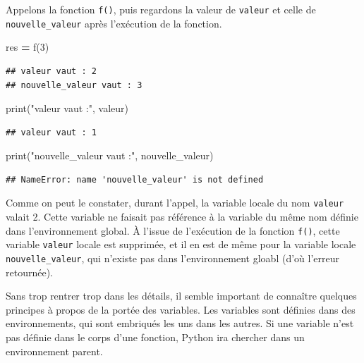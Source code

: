 \documentclass[
  12pt,
]{book}
\newenvironment{Shaded}{\begin{snugshade}}{\end{snugshade}}
\newcommand{\BuiltInTok}[1]{#1}
\newcommand{\DecValTok}[1]{\textcolor[rgb]{0.00,0.00,0.81}{#1}}
\newcommand{\NormalTok}[1]{#1}
\newcommand{\OperatorTok}[1]{\textcolor[rgb]{0.81,0.36,0.00}{\textbf{#1}}}
\newcommand{\StringTok}[1]{\textcolor[rgb]{0.31,0.60,0.02}{#1}}
\numberwithin{equation}{section}
\numberwithin{countremarque}{section}
\begin{document}
Appelons la fonction \texttt{f()}, puis regardons la valeur de \texttt{valeur} et celle de \texttt{nouvelle\_valeur} après l'exécution de la fonction.

\begin{Shaded}
\begin{Highlighting}[]
\NormalTok{res }\OperatorTok{=}\NormalTok{ f(}\DecValTok{3}\NormalTok{)}
\end{Highlighting}
\end{Shaded}

\begin{lstlisting}
## valeur vaut : 2
## nouvelle_valeur vaut : 3
\end{lstlisting}

\begin{Shaded}
\begin{Highlighting}[]
\BuiltInTok{print}\NormalTok{(}\StringTok{"valeur vaut :"}\NormalTok{, valeur)}
\end{Highlighting}
\end{Shaded}

\begin{lstlisting}
## valeur vaut : 1
\end{lstlisting}

\begin{Shaded}
\begin{Highlighting}[]
\BuiltInTok{print}\NormalTok{(}\StringTok{"nouvelle\_valeur vaut :"}\NormalTok{, nouvelle\_valeur)}
\end{Highlighting}
\end{Shaded}

\begin{lstlisting}
## NameError: name 'nouvelle_valeur' is not defined
\end{lstlisting}

Comme on peut le constater, durant l'appel, la variable locale du nom \texttt{valeur} valait 2. Cette variable ne faisait pas référence à la variable du même nom définie dans l'environnement global. À l'issue de l'exécution de la fonction \texttt{f()}, cette variable \texttt{valeur} locale est supprimée, et il en est de même pour la variable locale \texttt{nouvelle\_valeur}, qui n'existe pas dans l'environnement gloabl (d'où l'erreur retournée).

Sans trop rentrer trop dans les détails, il semble important de connaître quelques principes à propos de la portée des variables. Les variables sont définies dans des environnements, qui sont embriqués les uns dans les autres. Si une variable n'est pas définie dans le corps d'une fonction, Python ira chercher dans un environnement parent.
\end{document}
